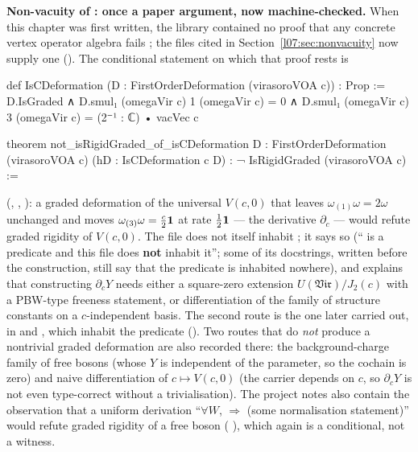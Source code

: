 \begin{warning}\label{l07:warn:nonvacuity}
\textbf{Non-vacuity of : once a paper argument, now machine-checked.} When this chapter was first written, the library contained no proof that any concrete vertex operator algebra fails
; the files cited in Section~\ref{l07:sec:nonvacuity} now supply one
(\allowbreak{}\allowbreak{}\allowbreak{}\allowbreak{}). The conditional statement on which that proof rests is
\begin{leancode}
def IsCDeformation (D : FirstOrderDeformation (virasoroVOA c)) : Prop :=
  D.IsGraded ∧
    D.smul₁ (omegaVir c) 1 (omegaVir c) = 0 ∧
    D.smul₁ (omegaVir c) 3 (omegaVir c) = (2⁻¹ : ℂ) • vacVec c

theorem not_isRigidGraded_of_isCDeformation {D : FirstOrderDeformation (virasoroVOA c)}
    (hD : IsCDeformation c D) : ¬ IsRigidGraded (virasoroVOA c) :=
\end{leancode}
(, ,
): a graded deformation of the universal
$V(c,0)$ that leaves $\omega_{(1)}\omega = 2\omega$ unchanged and moves $\omega_{(3)}\omega = \frac c2\mathbf{1}$ at
rate $\frac12\mathbf{1}$ --- the derivative $\partial_c$ --- would refute graded rigidity of $V(c,0)$.
The file  does not itself inhabit ; it says so
(`` is a predicate and this file does \textbf{not} inhabit it''; some of its docstrings,
written before the construction, still say that the predicate is inhabited nowhere), and
explains that constructing $\partial_cY$ needs either a square-zero extension
$U(\mathfrak{Vir})/J_2(c)$ with a PBW-type freeness statement, or differentiation of the family
of structure constants on a $c$-independent basis. The second route is the one later carried out, in
 and , which inhabit the predicate
(\allowbreak{}\allowbreak{}\allowbreak{}). Two routes that do \emph{not} produce a
nontrivial graded deformation are also recorded there: the background-charge family of free bosons
(whose $Y$ is independent of the parameter, so the cochain is zero) and naive differentiation of
$c\mapsto V(c,0)$ (the carrier  depends on $c$, so $\partial_cY$ is not even
type-correct without a trivialisation). The project notes also contain the observation that a
uniform derivation ``$\forall W$,  $\Rightarrow$ (some normalisation
statement)'' would refute graded rigidity of a free boson (\allowbreak
{}), which again is a conditional, not a witness.


\end{warning}
